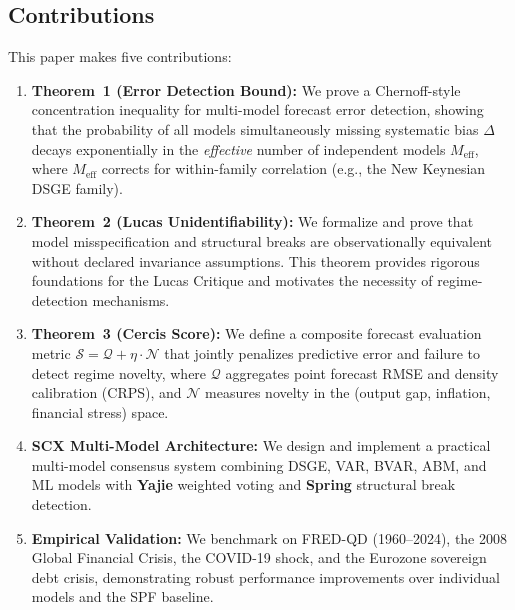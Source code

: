 \documentclass[12pt,a4paper]{article}
\begin{document}
\subsection{Contributions}

This paper makes five contributions:

\begin{enumerate}[label=(\arabic*), leftmargin=*]
    \item \textbf{Theorem~1 (Error Detection Bound):} We prove a Chernoff-style
    concentration inequality for multi-model forecast error detection,
    showing that the probability of all models simultaneously missing
    systematic bias $\Delta$ decays exponentially in the \emph{effective}
    number of independent models $M_{\text{eff}}$, where $M_{\text{eff}}$
    corrects for within-family correlation (e.g., the New Keynesian DSGE
    family).

    \item \textbf{Theorem~2 (Lucas Unidentifiability):} We formalize and prove
    that model misspecification and structural breaks are observationally
    equivalent without declared invariance assumptions.  This theorem
    provides rigorous foundations for the Lucas Critique and motivates
    the necessity of regime-detection mechanisms.

    \item \textbf{Theorem~3 (Cercis Score):} We define a composite forecast
    evaluation metric $\mathcal{S} = \mathcal{Q} + \eta \cdot \mathcal{N}$
    that jointly penalizes predictive error and failure to detect regime
    novelty, where $\mathcal{Q}$ aggregates point forecast RMSE and density
    calibration (CRPS), and $\mathcal{N}$ measures novelty in the (output
    gap, inflation, financial stress) space.

    \item \textbf{SCX Multi-Model Architecture:} We design and implement a
    practical multi-model consensus system combining DSGE, VAR, BVAR, ABM,
    and ML models with \textbf{Yajie} weighted voting and \textbf{Spring}
    structural break detection.

    \item \textbf{Empirical Validation:} We benchmark on FRED-QD (1960--2024),
    the 2008 Global Financial Crisis, the COVID-19 shock, and the Eurozone
    sovereign debt crisis, demonstrating robust performance improvements
    over individual models and the SPF baseline.
\end{enumerate}
\end{document}
